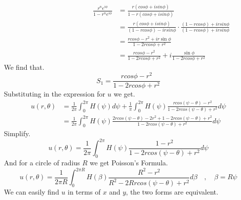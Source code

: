 \newpage
\begin{align*}
\hspace{4cm}
\frac{r^n e^{i\phi}}{1- r^n e^{i\phi}} &= \frac{r(cos\phi+isin\phi)}{1-r(cos\phi+isin\phi)}
\\
&= \frac{r(cos\phi+isin\phi)}{(1-rcos\phi)-irsin\phi} \cdot \frac{(1-rcos\phi)+irsin\phi}{(1-rcos\phi)+irsin\phi}
\\
&= \frac{rcos\phi - r^2 + ir \sin\phi}{1-2rcos\phi+r^2}
\\
&= \frac{rcos\phi - r^2}{1-2rcos\phi+r^2} + i \frac{\sin\phi}{1-2rcos\phi+r^2}
\end{align*}
We find that.
\[
    S_1 = \frac{rcos\phi - r^2}{1-2rcos\phi+r^2}    
\]
Substituting in the expression for $u$ we get.
\begin{align*}
u(r,\theta) &= \frac{1}{2\pi}\int_{0}^{2\pi} H(\psi ) d\psi  + \frac{1}{\pi}\int_{0}^{2\pi} H(\psi )\frac{rcos(\psi  -\theta) - r^2}{1-2rcos(\psi  -\theta)+r^2}d\psi 
\\
            &= \frac{1}{2\pi}\int_{0}^{2\pi} H(\psi )\frac{2rcos(\psi  -\theta) - 2r^2+1-2rcos(\psi  -\theta)+r^2}{1-2rcos(\psi  -\theta)+r^2}d\psi 
\end{align*}
Simplify.
\[
    u(r,\theta) = \frac{1}{2\pi}\int_{0}^{2\pi} H(\psi )\frac{1-r^2}{1-2rcos(\psi  -\theta)+r^2}d\psi     
\]
And for a circle of radius $R$ we get Poisson's Formula.
\[
    u(r,\theta) = \frac{1}{2\pi R}\int_{0}^{2\pi R} H(\beta)\frac{R^2-r^2}{R^2-2Rrcos(\psi  -\theta)+r^2}d\beta \quad, \quad \beta = R\psi     
\]
We can easily find $u$ in terms of $x$ and $y$, the two forms are equivalent.
